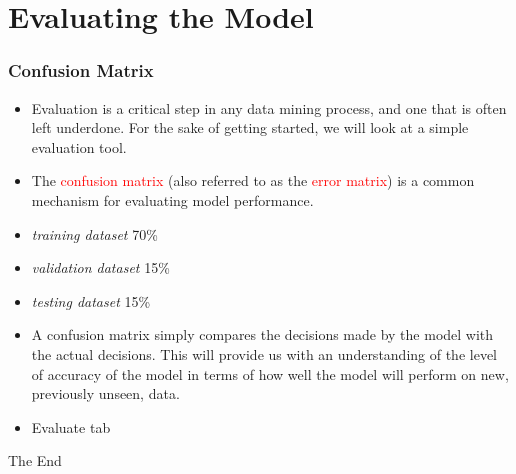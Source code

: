 \documentclass{beamer}\usepackage[]{graphicx}\usepackage[]{color}
\begin{document}
\section{Evaluating the Model}
\begin{frame}
\frametitle{Confusion Matrix}
\begin{itemize}
\item Evaluation is a critical step in any data mining process, and one that is often left underdone. For the sake of getting started, we will look at a simple evaluation tool.
\item The \textcolor{red}{confusion matrix} (also referred to as the \textcolor{red}{error matrix}) is a common mechanism for evaluating model performance.
\item \textit{training dataset} 70\%
\item \textit{validation dataset} 15\%
\item \textit{testing dataset} 15\%
\item A confusion matrix simply compares the decisions made by the model with the actual decisions. This will provide us with an understanding of the level of accuracy of the model in terms of how well the model will perform on new, previously unseen, data.
\item Evaluate tab
\end{itemize}
\end{frame}

\begin{frame}
\Huge{\centerline{The End}}
\end{frame}
\end{document}
